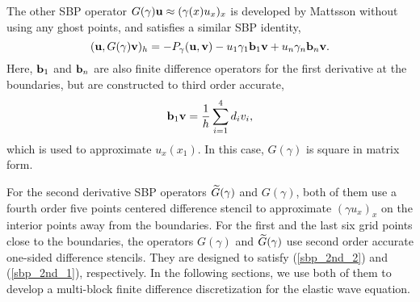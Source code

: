 The other SBP operator ${G}(\gamma){\bf u} \approx (\gamma(x)u_x)_x $ is developed by Mattsson \cite{mattsson2004summation} without using any ghost points, and satisfies a similar SBP identity,
\begin{equation}\label{sbp_2nd_2}
({\bf u}, G(\gamma){\bf v})_h = -P_\gamma({\bf u},{\bf v})-u_1\gamma_1{\bf b}_1{\bf v} + u_n\gamma_n{\bf b}_n{\bf v}.
\end{equation}
Here, ${\bf b}_1$ and ${\bf b}_n$ are also finite difference operators for the first derivative at the boundaries, but are constructed to third order accurate,
\begin{equation}\label{sbp_1st_2}
{\bf b}_1 {\bf v} = \frac{1}{h}\sum_{i=1}^{4} d_i v_i,
\end{equation}
which is used to approximate $u_x(x_1)$. In this case, ${G}(\gamma)$ is square in matrix form. 

For the second derivative SBP operators $\widetilde{G}(\gamma)$ and $G(\gamma)$, both of them use a fourth order five points centered difference stencil to approximate $(\gamma u_x)_x$ on the interior points away from the boundaries. For the first and the last six grid points close to the boundaries, the operators $G(\gamma)$ and $\widetilde{G}(\gamma)$ use second order accurate one-sided difference stencils. They are designed to satisfy (\ref{sbp_2nd_2}) and (\ref{sbp_2nd_1}), respectively. In the following sections, we use both of them to develop a multi-block finite difference discretization for the elastic wave equation. 
